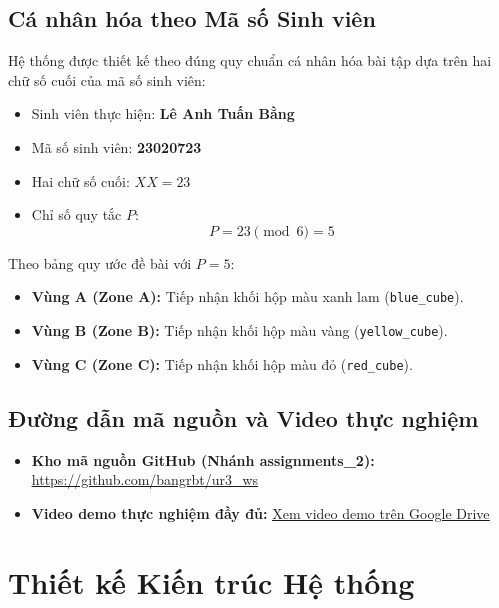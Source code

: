 \documentclass[a4paper,12pt]{article}
\begin{document}
\subsection{Cá nhân hóa theo Mã số Sinh viên}
Hệ thống được thiết kế theo đúng quy chuẩn cá nhân hóa bài tập dựa trên hai chữ số cuối của mã số sinh viên:
\begin{itemize}
    \item Sinh viên thực hiện: \textbf{Lê Anh Tuấn Bằng}
    \item Mã số sinh viên: \textbf{23020723}
    \item Hai chữ số cuối: $XX = 23$
    \item Chỉ số quy tắc $P$:
    \begin{equation}
    P = 23 \pmod 6 = 5
    \end{equation}
\end{itemize}

Theo bảng quy ước đề bài với $P = 5$:
\begin{itemize}[noitemsep]
    \item \textbf{Vùng A (Zone A):} Tiếp nhận khối hộp màu xanh lam (\texttt{blue\_cube}).
    \item \textbf{Vùng B (Zone B):} Tiếp nhận khối hộp màu vàng (\texttt{yellow\_cube}).
    \item \textbf{Vùng C (Zone C):} Tiếp nhận khối hộp màu đỏ (\texttt{red_cube}).
\end{itemize}

\subsection{Đường dẫn mã nguồn và Video thực nghiệm}
\begin{itemize}
    \item \textbf{Kho mã nguồn GitHub (Nhánh assignments\_2):} \href{https://github.com/bangrbt/ur3_ws/tree/assignments_2}{\color{blue}\underline{https://github.com/bangrbt/ur3\_ws}}
    \item \textbf{Video demo thực nghiệm đầy đủ:} \href{https://drive.google.com/file/d/1Q3-j9rzWxAJLO-lUi8Vy6dT-L9UdswkW/view?usp=sharing}{\color{blue}\underline{Xem video demo trên Google Drive}}
\end{itemize}

\section{Thiết kế Kiến trúc Hệ thống}
\end{document}
